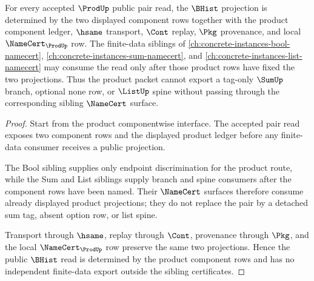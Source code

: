 \begin{theorem}
\label{thm:prod-bhist-pair-projection-determinacy}
For every accepted $\ProdUp$ public pair read, the $\BHist$ projection is determined by the two displayed component rows together with the product component ledger, $\hsame$ transport, $\Cont$ replay, $\Pkg$ provenance, and local $\NameCert_{\ProdUp}$ row. The finite-data siblings of \autoref{ch:concrete-instances-bool-namecert}, \autoref{ch:concrete-instances-sum-namecert}, and \autoref{ch:concrete-instances-list-namecert} may consume the read only after those product rows have fixed the two projections. Thus the product packet cannot export a tag-only $\SumUp$ branch, optional none row, or $\ListUp$ spine without passing through the corresponding sibling $\NameCert$ surface.
\end{theorem}
\begin{proof}
Start from the product componentwise interface. The accepted pair read exposes two component rows and the displayed product ledger before any finite-data consumer receives a public projection.

The Bool sibling supplies only endpoint discrimination for the product route, while the Sum and List siblings supply branch and spine consumers after the component rows have been named. Their $\NameCert$ surfaces therefore consume already displayed product projections; they do not replace the pair by a detached sum tag, absent option row, or list spine.

Transport through $\hsame$, replay through $\Cont$, provenance through $\Pkg$, and the local $\NameCert_{\ProdUp}$ row preserve the same two projections. Hence the public $\BHist$ read is determined by the product component rows and has no independent finite-data export outside the sibling certificates.
\end{proof}
